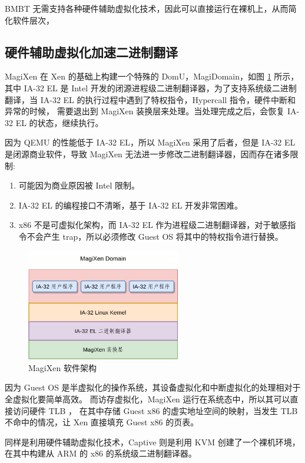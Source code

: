 BMBT 无需支持各种硬件辅助虚拟化技术，因此可以直接运行在裸机上，从而简化软件层次，

\subsection{硬件辅助虚拟化加速二进制翻译}
MagiXen 在 Xen \citep{barham2003xen} 的基础上构建一个特殊的 DomU，MagiDomain，如图 \ref{fig:MagiXen} 所示，
其中 IA-32 EL \citep{1253195} 是 Intel 开发的闭源进程级二进制翻译器，为了支持系统级二进制翻译，当 IA-32 EL 的执行过程中遇到了特权指令，Hypercall 指令，硬件中断和异常的时候，
需要退出到 MagiXen 装换层来处理。当处理完成之后，会恢复 IA-32 EL 的状态，继续执行。

因为 QEMU 的性能低于 IA-32 EL，所以 MagiXen 采用了后者，但是 IA-32 EL 是闭源商业软件，导致 MagiXen 无法进一步修改二进制翻译器，因而存在诸多限制:
\begin{enumerate}
	\item 可能因为商业原因被 Intel 限制。
	\item IA-32 EL 的编程接口不清晰，基于 IA-32 EL 开发非常困难。
	\item x86 不是可虚拟化架构，而 IA-32 EL 作为进程级二进制翻译器，对于敏感指令不会产生 trap，所以必须修改 Guest OS 将其中的特权指令进行替换。
\end{enumerate}

\begin{figure}[!htbp]
	\centering
	\includegraphics[width=0.6\textwidth]{./images/MagiXen.jpg}
	\caption{MagiXen 软件架构}
	\label{fig:MagiXen}
\end{figure}

因为 Guest OS 是半虚拟化的操作系统，其设备虚拟化和中断虚拟化的处理相对于全虚拟化要简单高效。
而访存虚拟化，MagiXen 运行在系统态中，所以其可以直接访问硬件 TLB ，
在其中存储 Guest x86 的虚实地址空间的映射，当发生 TLB 不命中的情况，让 Xen 直接填充 Guest x86 的页表。

同样是利用硬件辅助虚拟化技术，Captive 则是利用 KVM 创建了一个裸机环境，在其中构建从 ARM 的 x86 的系统级二进制翻译器。

